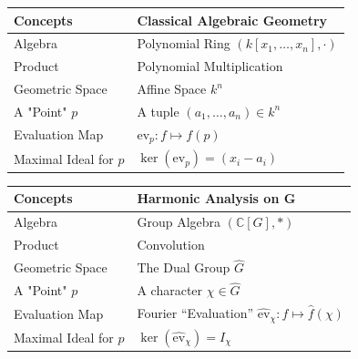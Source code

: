 \documentclass{article}
\begin{document}
\begin{center}
\begin{tabular}{l|l}
	\textbf{Concepts} & \textbf{Classical Algebraic Geometry} \\
	\hline
	Algebra & Polynomial Ring $(k[x_1, \dots, x_n], \cdot)$ \\
	Product & Polynomial Multiplication \\
	Geometric Space & Affine Space $k^n$ \\
	A "Point" $p$ & A tuple $(a_1, \dots, a_n) \in k^n$ \\
	Evaluation Map & $\text{ev}_p: f \mapsto f(p)$ \\
    Maximal Ideal for $p$ & $\ker(\text{ev}_p) = ( x_i - a_i )$ \\
\end{tabular}


\begin{tabular}{l|l}
	\textbf{Concepts} & \textbf{Harmonic Analysis on G} \\
	\hline
	Algebra & Group Algebra $(\mathbb{C}[G], *)$ \\
	Product & Convolution \\
	Geometric Space & The Dual Group $\widehat{G}$ \\
	A "Point" $p$ & A character $\chi \in \widehat{G}$ \\
	Evaluation Map & Fourier ``Evaluation'' $\widehat{\text{ev}}_\chi: f \mapsto \hat{f}(\chi)$ \\
    Maximal Ideal for $p$ & $\ker(\widehat{\text{ev}}_\chi) = I_\chi$ \\
\end{tabular}
\end{center}




\printbibliography
\end{document}
